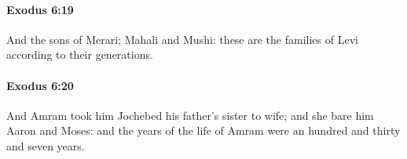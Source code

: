 		\paragraph{Exodus 6:19} %
			\label{EXODUS-6-19}

			And the sons of Merari; Mahali and Mushi: these are the families of Levi according to their generations.


		\paragraph{Exodus 6:20} %
			\label{EXODUS-6-20}

			And Amram took him Jochebed his father's sister to wife; and she bare him Aaron and Moses: and the years of the life of Amram were an hundred and thirty and seven years.


